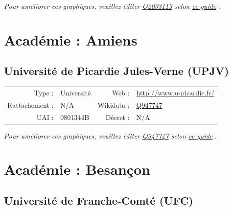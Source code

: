 \documentclass[12pt,french,landscape]{article}
\begin{document}
\textit{\scriptsize Pour améliorer ces graphiques, veuillez éditer \href{https://www.wikidata.org/entity/Q2033119}{Q2033119}  selon \href{https://github.com/cpesr/wikidataESR/blob/master/Rmd/wikidataESR.md}{ce guide}}
.


\newpage

\hypertarget{acaduxe9mie-amiens}{%
\section{Académie : Amiens}\label{acaduxe9mie-amiens}}

\hypertarget{universituxe9-de-picardie-jules-verne-upjv}{%
\subsection{Université de Picardie Jules-Verne
(UPJV)}\label{universituxe9-de-picardie-jules-verne-upjv}}

\begin{tabular*}{0.45\textwidth}{rp{2cm}rl}  
\hline  
Type : & Université & Web : &\href{http://www.u-picardie.fr/}{http://www.u-picardie.fr/} \\  
Rattachement : & N/A & Wikidata : & \href{https://www.wikidata.org/entity/Q947747}{Q947747} \\  
UAI : & 0801344B & Décret : & N/A \\  
\hline  
\end{tabular*}

\textit{\scriptsize Pour améliorer ces graphiques, veuillez éditer \href{https://www.wikidata.org/entity/Q947747}{Q947747}  selon \href{https://github.com/cpesr/wikidataESR/blob/master/Rmd/wikidataESR.md}{ce guide}}
.


\newpage

\hypertarget{acaduxe9mie-besanuxe7on}{%
\section{Académie : Besançon}\label{acaduxe9mie-besanuxe7on}}

\hypertarget{universituxe9-de-franche-comtuxe9-ufc}{%
\subsection{Université de Franche-Comté
(UFC)}\label{universituxe9-de-franche-comtuxe9-ufc}}
\end{document}
